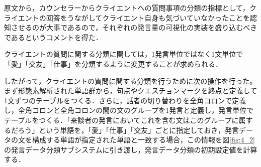 \documentclass[shuuron]{kuee}
\begin{document}


原文から，カウンセラーからクライエントへの質問事項の分類の指標として，クライエントの回答をうながしてクライエント自身も気づいていなかったことを認知させるのが大事であるので，それぞれの発言量の可視化の実装を盛り込むべきであるというコメントを得た．

クライエントの質問に関する分類に関しては，1発言単位ではなく1文単位で「愛」「交友」「仕事」を分類するように変更することが求められる．


したがって，クライエントの質問に関する分類を行うために次の操作を行った。まず形態素解析された単語群から，句点やクエスチョンマークを終点と定義して1文ずつのテーブルをつくる．さらに，話者の切り替わりを全角コロンで定義し，全角コロンと全角コロンの間の文のグループを1発言と定義し，発言単位でテーブルをつくる．「来談者の発言においてこれを含む文はこのグループに属するだろう」という単語を，「愛」「仕事」「交友」ごとに指定しておき，発言データの文を構成する単語が指定された単語と一致する場合，この情報を図\ref{fig:4_2}の発言データ分類サブシステムに引き渡し，発言データ分類の初期設定値を計算する．
\end{document}
